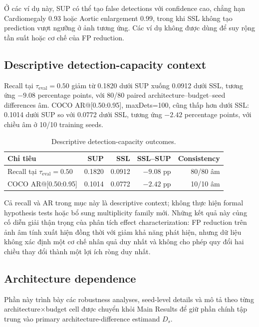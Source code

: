 \documentclass[pdflatex,sn-mathphys-num]{sn-jnl}%
\theoremstyle{thmstyleone}%
\theoremstyle{thmstyletwo}%
\theoremstyle{thmstylethree}%
\begin{document}
Ở các ví dụ này, SUP có thể tạo false detections với confidence cao, chẳng hạn Cardiomegaly 0.93 hoặc Aortic enlargement 0.99, trong khi SSL không tạo prediction vượt ngưỡng ở ảnh tương ứng. Các ví dụ không được dùng để suy rộng tần suất hoặc cơ chế của FP reduction.

\subsection{Descriptive detection-capacity context}

Recall tại $\tau_{\mathrm{eval}}=0.50$ giảm từ 0.1820 dưới SUP xuống 0.0912 dưới SSL, tương ứng $-9.08$ percentage points, với 80/80 paired architecture--budget--seed differences âm. COCO AR@[0.50:0.95], maxDets=100, cũng thấp hơn dưới SSL: 0.1014 dưới SUP so với 0.0772 dưới SSL, tương ứng $-2.42$ percentage points, với chiều âm ở 10/10 training seeds.

\begin{table}[htbp]
\centering
\caption{Descriptive detection-capacity outcomes.}
\label{tab:supp_sq2_detection_capacity}
\small
\begin{tabular}{lrrrr}
\toprule
\textbf{Chỉ tiêu} & \textbf{SUP} & \textbf{SSL} & \textbf{SSL--SUP} & \textbf{Consistency}\\
\midrule
Recall tại $\tau_{\mathrm{eval}}=0.50$ & 0.1820 & 0.0912 & $-9.08$ pp & 80/80 âm\\
COCO AR@[0.50:0.95] & 0.1014 & 0.0772 & $-2.42$ pp & 10/10 âm\\
\bottomrule
\end{tabular}
\end{table}

Cả recall và AR trong mục này là descriptive context; không thực hiện formal hypothesis tests hoặc bổ sung multiplicity family mới. Những kết quả này củng cố diễn giải thận trọng của phân tích effect characterization: FP reduction trên ảnh âm tính xuất hiện đồng thời với giảm khả năng phát hiện, nhưng dữ liệu không xác định một cơ chế nhân quả duy nhất và không cho phép quy đổi hai chiều thay đổi thành một lợi ích ròng duy nhất.

\subsection{Architecture dependence}
\label{sec:supp_sq3}

Phần này trình bày các robustness analyses, seed-level details và mô tả theo từng architecture$\times$budget cell được chuyển khỏi Main Results để giữ phần chính tập trung vào primary architecture-difference estimand $D_s$.
\end{document}
